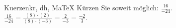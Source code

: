 \begin{MAufgabe}{Kuerzen}{kr, dh, MaTeX}
K\"urzen Sie soweit m\"oglich: $\frac{16}{-24}$.\\ 
\ifLsg\MLoesung
\quad $\frac{16}{-24}=\frac{(8)\cdot(2)}{(8)\cdot(-3)}=\frac{2}{-3}=\frac{-2}{3}$.\else\relax\fi
 \end{MAufgabe}